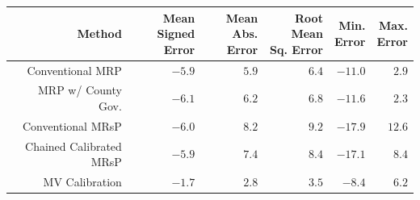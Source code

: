 
\begin{tabular}{rrrrrr}
\toprule
Method & \makecell[r]{Mean\\Signed Error} & \makecell[r]{Mean\\Abs. Error} & \makecell[r]{Root Mean\\Sq. Error} & \makecell[r]{Min.\\Error} & \makecell[r]{Max.\\Error}\\
\midrule
Conventional MRP & $-5.9$ & $5.9$ & $6.4$ & $-11.0$ & $ 2.9$\\
MRP w/
County Gov. & $-6.1$ & $6.2$ & $6.8$ & $-11.6$ & $ 2.3$\\
Conventional MRsP & $-6.0$ & $8.2$ & $9.2$ & $-17.9$ & $12.6$\\
\addlinespace
Chained Calibrated MRsP & $-5.9$ & $7.4$ & $8.4$ & $-17.1$ & $ 8.4$\\
MV Calibration & $-1.7$ & $2.8$ & $3.5$ & $ -8.4$ & $ 6.2$\\
\bottomrule
\end{tabular}